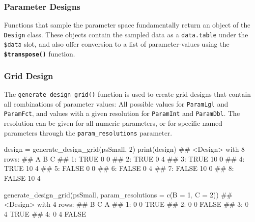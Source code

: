 \documentclass[
  11pt,
  parskip=half,
  DIV=calc,
  BCOR=10mm,
  x11names]{scrbook}
\newenvironment{Shaded}{}{}
\newcommand{\DataTypeTok}[1]{#1}
\newcommand{\DecValTok}[1]{#1}
\newcommand{\KeywordTok}[1]{\textcolor[rgb]{0.00,0.00,1.00}{#1}}
\newcommand{\NormalTok}[1]{#1}
\newcommand{\StringTok}[1]{\textcolor[rgb]{0.00,0.50,0.50}{#1}}
\begin{document}
\hypertarget{parameter-designs}{%
\subsubsection{Parameter Designs}\label{parameter-designs}}

Functions that sample the parameter space fundamentally return an object of the \texttt{Design} class.
These objects contain the sampled data as a \texttt{data.table} under the \texttt{\$data} slot, and also offer conversion to a list of parameter-values using the \textbf{\texttt{\$transpose()}} function.

\hypertarget{grid-design}{%
\subsubsection{Grid Design}\label{grid-design}}

The \texttt{generate\_design\_grid()} function is used to create grid designs that contain all combinations of parameter values: All possible values for \texttt{ParamLgl} and \texttt{ParamFct}, and values with a given resolution for \texttt{ParamInt} and \texttt{ParamDbl}.
The resolution can be given for all numeric parameters, or for specific named parameters through the \texttt{param\_resolutions} parameter.

\begin{Shaded}
\begin{Highlighting}[]
\NormalTok{design =}\StringTok{ }\KeywordTok{generate_design_grid}\NormalTok{(psSmall, }\DecValTok{2}\NormalTok{)}
\KeywordTok{print}\NormalTok{(design)}
\NormalTok{## <Design> with 8 rows:}
\NormalTok{##        A  B C}
\NormalTok{## 1:  TRUE  0 0}
\NormalTok{## 2:  TRUE  0 4}
\NormalTok{## 3:  TRUE 10 0}
\NormalTok{## 4:  TRUE 10 4}
\NormalTok{## 5: FALSE  0 0}
\NormalTok{## 6: FALSE  0 4}
\NormalTok{## 7: FALSE 10 0}
\NormalTok{## 8: FALSE 10 4}
\end{Highlighting}
\end{Shaded}

\begin{Shaded}
\begin{Highlighting}[]
\KeywordTok{generate_design_grid}\NormalTok{(psSmall, }\DataTypeTok{param_resolutions =} \KeywordTok{c}\NormalTok{(}\DataTypeTok{B =} \DecValTok{1}\NormalTok{, }
  \DataTypeTok{C =} \DecValTok{2}\NormalTok{))}
\NormalTok{## <Design> with 4 rows:}
\NormalTok{##    B C     A}
\NormalTok{## 1: 0 0  TRUE}
\NormalTok{## 2: 0 0 FALSE}
\NormalTok{## 3: 0 4  TRUE}
\NormalTok{## 4: 0 4 FALSE}
\end{Highlighting}
\end{Shaded}
\end{document}
